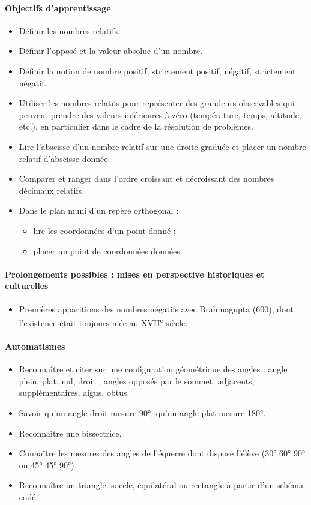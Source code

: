 \documentclass[11pt,a4paper]{article}
\begin{document}
\paragraph{Objectifs d'apprentissage}
\begin{itemize}[label=\bullet]
    \item Définir les nombres relatifs.
    \item Définir l'opposé et la valeur absolue d'un nombre.
    \item Définir la notion de nombre positif, strictement positif, négatif, strictement négatif.
    \item Utiliser les nombres relatifs pour représenter des grandeurs observables qui peuvent prendre des valeurs inférieures à zéro (température, temps, altitude, etc.), en particulier dans le cadre de la résolution de problèmes.
    \item Lire l'abscisse d'un nombre relatif sur une droite graduée et placer un nombre relatif d'abscisse donnée.
    \item Comparer et ranger dans l'ordre croissant et décroissant des nombres décimaux relatifs.
    \item Dans le plan muni d'un repère orthogonal :
    \begin{itemize}[label=-]
        \item lire les coordonnées d'un point donné ;
        \item placer un point de coordonnées données.
    \end{itemize}
\end{itemize}

\paragraph{Prolongements possibles : mises en perspective historiques et culturelles}
\begin{itemize}[label=\bullet]
    \item Premières apparitions des nombres négatifs avec Brahmagupta (600), dont l'existence était toujours niée au XVII\textsuperscript{e} siècle.
\end{itemize}

\paragraph{Automatismes}
\begin{itemize}[label=\bullet]
    \item Reconnaître et citer sur une configuration géométrique des angles : angle plein, plat, nul, droit ; angles opposés par le sommet, adjacents, supplémentaires, aigus, obtus.
    \item Savoir qu'un angle droit mesure 90°, qu'un angle plat mesure 180°.
    \item Reconnaître une bissectrice.
    \item Connaître les mesures des angles de l'équerre dont dispose l'élève (30° 60° 90° ou 45° 45° 90°).
    \item Reconnaître un triangle isocèle, équilatéral ou rectangle à partir d'un schéma codé.
\end{itemize}
\end{document}
